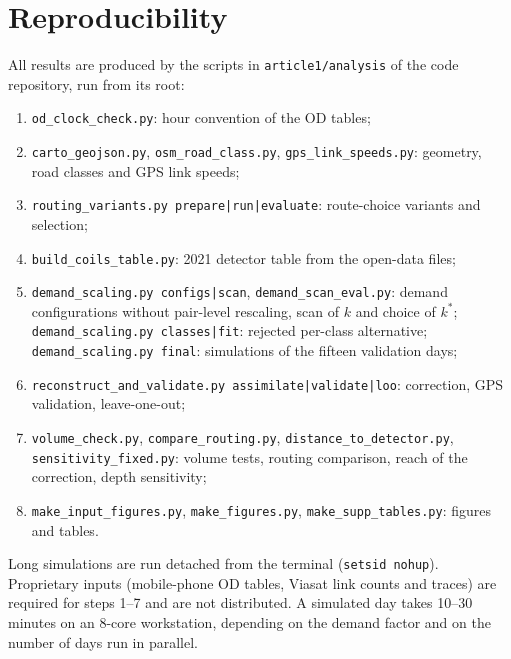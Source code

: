 \documentclass[11pt,a4paper]{article}
\newcommand{\code}[1]{\texttt{#1}}
\begin{document}


\section{Reproducibility}
\label{sec:reproducibility}

All results are produced by the scripts in \code{article1/analysis} of the code repository, run from its root:
\begin{enumerate}
\item \code{od\_clock\_check.py}: hour convention of the OD tables;
\item \code{carto\_geojson.py}, \code{osm\_road\_class.py}, \code{gps\_link\_speeds.py}: geometry, road classes and GPS link speeds;
\item \code{routing\_variants.py prepare|run|evaluate}: route-choice variants and selection;
\item \code{build\_coils\_table.py}: 2021 detector table from the open-data files;
\item \code{demand\_scaling.py configs|scan}, \code{demand\_scan\_eval.py}: demand configurations without pair-level rescaling, scan of $k$ and choice of $k^*$; \code{demand\_scaling.py classes|fit}: rejected per-class alternative; \code{demand\_scaling.py final}: simulations of the fifteen validation days;
\item \code{reconstruct\_and\_validate.py assimilate|validate|loo}: correction, GPS validation, leave-one-out;
\item \code{volume\_check.py}, \code{compare\_routing.py}, \code{distance\_to\_detector.py}, \code{sensitivity\_fixed.py}: volume tests, routing comparison, reach of the correction, depth sensitivity;
\item \code{make\_input\_figures.py}, \code{make\_figures.py}, \code{make\_supp\_tables.py}: figures and tables.
\end{enumerate}
Long simulations are run detached from the terminal (\code{setsid nohup}). Proprietary inputs (mobile-phone OD tables, Viasat link counts and traces) are required for steps 1--7 and are not distributed. A simulated day takes 10--30 minutes on an 8-core workstation, depending on the demand factor and on the number of days run in parallel.
\end{document}
